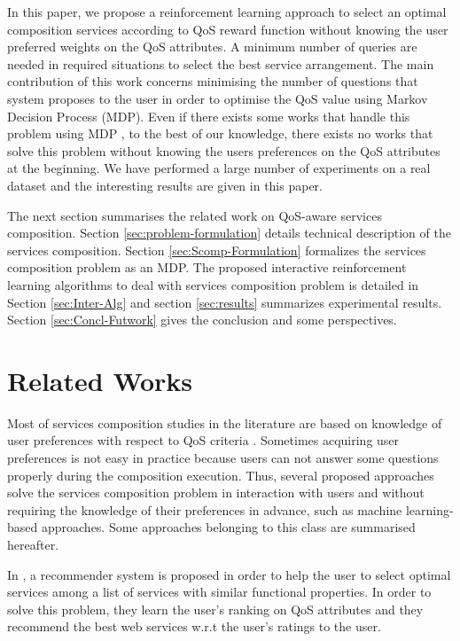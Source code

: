 \documentclass[10pt,journal,compsoc]{IEEEtran}
\begin{document}
In this paper, we propose a reinforcement learning approach to select an optimal composition services according to QoS reward function without knowing the user preferred weights on the QoS attributes. A minimum number of queries are needed in required situations to select the best service arrangement. The main contribution of this work concerns minimising the number of questions that system proposes to the user in order to optimise the QoS value using Markov Decision Process (MDP). Even if there exists some works that handle this problem using MDP \cite{Mostafa2015}, to the best of our knowledge, there exists no works that solve this problem without knowing the users preferences on the QoS attributes at the beginning. %
We have performed a large number of experiments on a real dataset \cite{Zheng2014} and the interesting results are given in this paper.

The next section summarises the related work on QoS-aware services composition. Section \ref{sec:problem-formulation} details technical description of the services composition. Section \ref{sec:Scomp-Formulation} formalizes the services composition problem as an MDP. The proposed interactive reinforcement learning algorithms to deal with services composition problem is detailed in Section \ref{sec:Inter-Alg} %
and section \ref{sec:results} summarizes experimental results. Section \ref{sec:Concl-Futwork} gives the conclusion and some perspectives.


\section{Related Works} \label{sec:related-work}

Most of services composition studies in the literature are based on knowledge of user preferences with respect to QoS criteria \cite{mallayya2015,a-Ahmed2011,Fukuda1997,cao2009}. Sometimes acquiring user preferences is not easy in practice because users can not answer some questions properly during the composition execution\cite{skoutas2010ranking}. Thus, several proposed approaches solve the services composition problem in interaction with users and without requiring the knowledge of their preferences in advance, such as machine learning-based approaches. Some approaches belonging to this class are summarised hereafter.

In \cite{Manikrao2005}, a recommender system is proposed in order to help the user to select optimal services among a list of services with similar functional properties. In order to solve this problem, they learn the user's ranking on QoS attributes and they recommend the best web services w.r.t the user's ratings to the user.
\end{document}
